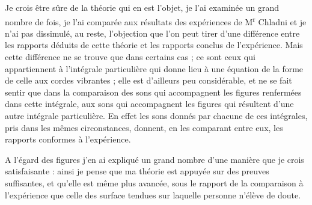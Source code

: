 \documentclass[11pt,a4paper]{article}
\begin{document}
Je crois être sûre de la théorie qui en est l'objet, je l'ai examinée un grand nombre de fois, je l'ai comparée aux résultats des expériences de M\textsuperscript{r} Chladni et je n'ai pas dissimulé, au reste, l'objection que l'on peut tirer d'une différence entre les rapports déduits de cette théorie et les rapports conclus de l'expérience. Mais cette différence ne se trouve que dans certains cas ; ce sont ceux qui appartiennent à l'intégrale particulière qui donne lieu à une équation de la forme de celle aux cordes vibrantes ; elle est d'ailleurs peu considérable, et ne se fait sentir que dans la comparaison des sons qui accompagnent les figures renfermées dans cette intégrale, aux sons qui accompagnent les figures qui résultent d'une autre intégrale particulière. En effet les sons donnés par chacune de ces intégrales, pris dans les mêmes circonstances, donnent, en les comparant entre eux,  les  rapports    conformes à l'expérience.

A l'égard des figures j'en ai expliqué un grand nombre  d'une manière  que je crois satisfaisante : ainsi je  pense  que ma théorie est \struck{\ill{}} appuyée sur des preuves suffisantes, et qu'elle est même plus avancée, sous le rapport de la comparaison à l'expérience que celle des surface tendues sur laquelle personne n'élève de doute.

\end{document}
